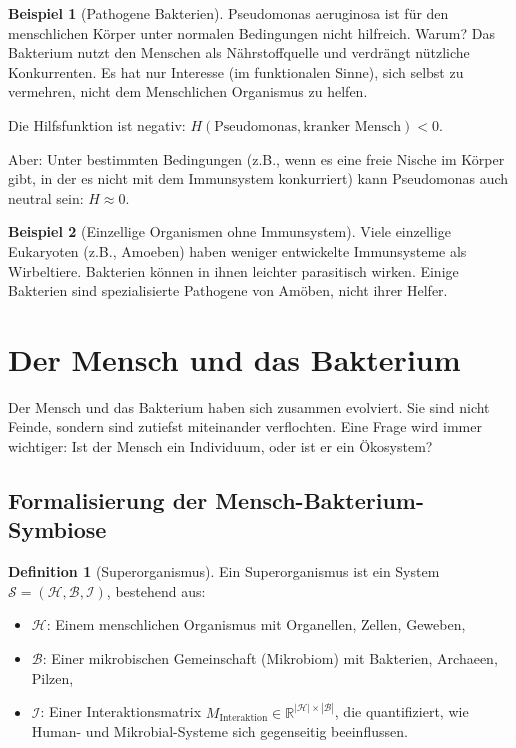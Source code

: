 \documentclass[a4paper,12pt]{article}
\theoremstyle{definition}
\newtheorem{definition}{Definition}
\newtheorem{beispiel}{Beispiel}
\begin{document}
\begin{beispiel}[Pathogene Bakterien]
Pseudomonas aeruginosa ist für den menschlichen Körper unter normalen Bedingungen nicht hilfreich. Warum? Das Bakterium nutzt den Menschen als Nährstoffquelle und verdrängt nützliche Konkurrenten. Es hat nur Interesse (im funktionalen Sinne), sich selbst zu vermehren, nicht dem Menschlichen Organismus zu helfen.

Die Hilfsfunktion ist negativ: $H(\text{Pseudomonas}, \text{kranker Mensch}) < 0$.

Aber: Unter bestimmten Bedingungen (z.B., wenn es eine freie Nische im Körper gibt, in der es nicht mit dem Immunsystem konkurriert) kann Pseudomonas auch neutral sein: $H \approx 0$.
\end{beispiel}

\begin{beispiel}[Einzellige Organismen ohne Immunsystem]
Viele einzellige Eukaryoten (z.B., Amoeben) haben weniger entwickelte Immunsysteme als Wirbeltiere. Bakterien können in ihnen leichter parasitisch wirken. Einige Bakterien sind spezialisierte Pathogene von Amöben, nicht ihrer Helfer.
\end{beispiel}

\section{Der Mensch und das Bakterium}

Der Mensch und das Bakterium haben sich zusammen evolviert. Sie sind nicht Feinde, sondern sind zutiefst miteinander verflochten. Eine Frage wird immer wichtiger: Ist der Mensch ein Individuum, oder ist er ein Ökosystem?

\subsection{Formalisierung der Mensch-Bakterium-Symbiose}

\begin{definition}[Superorganismus]
Ein Superorganismus ist ein System $\mathcal{S} = (\mathcal{H}, \mathcal{B}, \mathcal{I})$, bestehend aus:
\begin{itemize}
    \item[-] $\mathcal{H}$: Einem menschlichen Organismus mit Organellen, Zellen, Geweben,
    \item[-] $\mathcal{B}$: Einer mikrobischen Gemeinschaft (Mikrobiom) mit Bakterien, Archaeen, Pilzen,
    \item[-] $\mathcal{I}$: Einer Interaktionsmatrix $M_{\text{Interaktion}} \in \mathbb{R}^{|\mathcal{H}| \times |\mathcal{B}|}$, die quantifiziert, wie Human- und Mikrobial-Systeme sich gegenseitig beeinflussen.
\end{itemize}
\end{definition}
\end{document}
